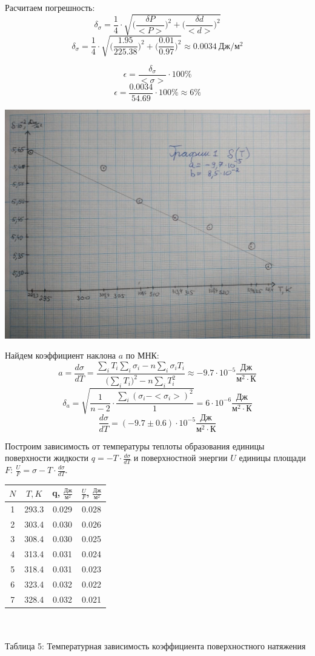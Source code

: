\documentclass[a4paper,12pt]{article} %
\begin{document}
Расчитаем погрешность:
\[\delta_\sigma = \frac{1}{4}\cdot \sqrt{\Big(\frac{\delta P}{<P>}\Big)^2 + \Big(\frac{\delta d}{<d>}\Big)^2}\]
\[\delta_\sigma = \frac{1}{4}\cdot \sqrt{\Big(\frac{1.95}{225.38}\Big)^2 + \Big(\frac{0.01}{0.97}\Big)^2} \approx 0.0034\ Дж/м^2\]

\[\epsilon = \frac{\delta_\sigma}{<\sigma>}\cdot 100\%\]
\[\epsilon = \frac{0.0034}{54.69}\cdot 100\% \approx 6\%\]

\includegraphics[width=1\textwidth]{1.jpg}

Найдем коэффициент наклона $a$ по МНК:
\[ a = \frac{d\sigma}{dT}= \frac{\sum_i T_i \sum_i \sigma_i - n\sum_i \sigma_i T_i}{\big(\sum_i T_i\big)^2 - n\sum_i T_i^2} \approx -9.7\cdot 10^{-5}\frac{Дж}{м^2 \cdot К}\]
\[\delta_a = \sqrt{\frac{1}{n-2}\cdot \frac{\sum_i(\sigma_i - <\sigma_i>)^2}{1}} = 6\cdot 10^{-6} \frac{Дж}{м^2 \cdot К}\]
\[\frac{d\sigma}{dT}=(-9.7 \pm 0.6)\cdot 10^{-5} \frac{Дж}{м^2 \cdot К}\]

Построим зависимость от температуры теплоты образования единицы поверхности жидкости $q = -T\cdot \frac{d\sigma}{dT}$ и поверхностной энергии $U$ единицы площади $F$: $\frac{U}{F} = \sigma - T\cdot \frac{d\sigma}{dT}$.

\begin{tabular}{ | c | c | c | c | }
\hline
 $N$ & $T, K$ & q, $\frac{Дж}{м^2}$ & $\frac{U}{F}$, $\frac{Дж}{м^2}$ \\ \hline
1& 293.3 & 0.029 & 0.028\\ \hline
2& 303.4 & 0.030 & 0.026\\ \hline
3& 308.4 & 0.030 & 0.025\\ \hline
4& 313.4 & 0.031 & 0.024\\ \hline
5& 318.4 & 0.031 & 0.023\\ \hline
6& 323.4 & 0.032 & 0.022\\ \hline
7& 328.4 & 0.032 & 0.021\\ \hline
\end{tabular}\\
\setlength{\parskip}{0.3cm}\\
Таблица 5: Температурная зависимость коэффициента поверхностного натяжения
\end{document}
